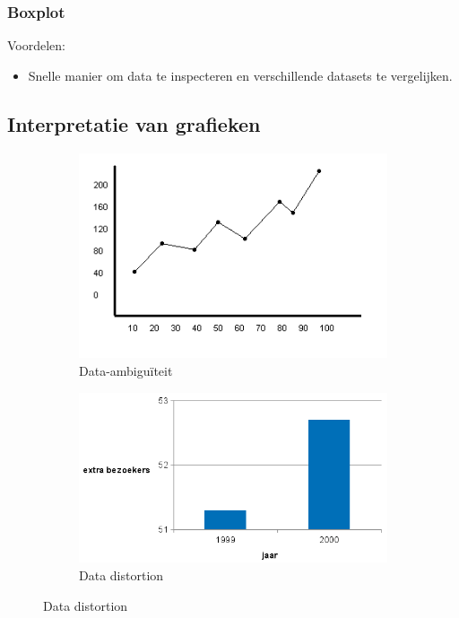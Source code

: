 \documentclass[a4paper,12pt]{article}
\begin{document}
\subsubsection{Boxplot}
Voordelen:
\begin{itemize}
\item Snelle manier om data te inspecteren en verschillende datasets te vergelijken.
\end{itemize}

\subsection{Interpretatie van grafieken}
\begin{figure}[H]
\centering
\begin{subfigure}{.49\textwidth}
  \centering
  \includegraphics[width=.9\linewidth]{img/Hoofdstuk_2/data-ambiguiteit.png}
  \caption{Data-ambiguïteit}
  \label{fig:data-ambiguiteit}
\end{subfigure}
\begin{subfigure}{.49\textwidth}
  \centering
  \includegraphics[width=.9\linewidth]{img/Hoofdstuk_2/data_distortion.png}
  \caption{Data distortion}

\end{subfigure}
\end{figure}
\end{document}
